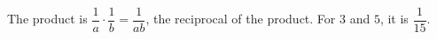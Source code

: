The product is $\dfrac{1}{a}\cdot\dfrac{1}{b}=\dfrac{1}{ab}$, the reciprocal of the product. For $3$ and $5$, it is $\boxed{\dfrac{1}{15}}$.
